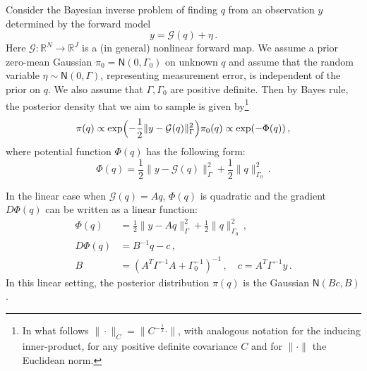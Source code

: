 \documentclass[12pt]{caltech_thesis}
\numberwithin{equation}{section}
\begin{document}
Consider the Bayesian inverse problem of finding $q$ from an observation $y$ determined by the forward model 
$$y=\mathcal{G}(q)+\eta\,.$$
{Here $\mathcal{G}:\mathbb{R}^N \to \mathbb{R}^J$ is a {(in general)} nonlinear forward map. We assume a prior zero-mean Gaussian $\pi_{0}=\mathsf{N}(0, \Gamma_0)$ on unknown $q$ and assume that
{the random variable} $\eta \sim \mathsf{N}(0, \Gamma)$, representing measurement error, is independent of the prior on $q$. 
We also assume that $\Gamma, \Gamma_0$ are positive definite.} Then by Bayes rule, the posterior density that we aim to sample is given by\footnote{{In what follows $\|\cdot\|_{C}=\|C^{-\frac12}\cdot\|$, with analogous notation for the
inducing inner-product, for any positive definite covariance $C$ and for $\|\cdot\|$ the Euclidean norm.}}
{$$\pi(q) \propto \exp \Bigl(-\frac{1}{2}\|y-\mathcal{G}(q)\|_{\Gamma}^{2}\Bigr) \pi_{0}(q) \propto {\exp}(-\Phi(q))\,,$$
where potential function $\Phi(q)$ has the following form:}
\begin{equation}
\label{invf}
\Phi(q)=\frac{1}{2}\|y-\mathcal{G}(q)\|_{\Gamma}^{2}+\frac{1}{2}\|q\|_{\Gamma_0}^{2}\,.
\end{equation}
 
{In the linear case when $\mathcal{G}(q)=Aq$, $\Phi(q)$ is quadratic
 and the gradient $D\Phi(q)$ can be written as a linear function:
\begin{subequations}
\label{eq:quad}
\begin{align}
\Phi(q)&=\frac{1}{2}\|y-Aq\|_{\Gamma}^{2}+\frac{1}{2}\|q\|_{\Gamma_0}^{2}\,,\\
D\Phi(q)&=B^{-1}q-c\,,\\
B&=(A^T\Gamma^{-1} A+\Gamma_0^{-1})^{-1}\,,\quad
c=A^T\Gamma^{-1} y\,.
\end{align}
\end{subequations}
{In this linear setting,} the posterior distribution $\pi(q)$ is the Gaussian $\mathsf{N}(Bc,B)$.}
\end{document}

